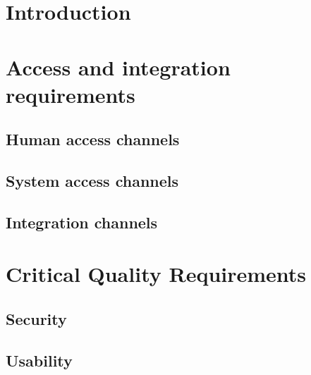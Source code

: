 \documentclass[a4paper,12pt,titlepage]{article}
\begin{document}


\tableofcontents
\newpage
\section{Introduction}

%
		
\section{Access and integration requirements}
	\subsection{Human access channels}
		
	\subsection{System access channels}
	
	\subsection{Integration channels}
	
\newpage
\section{Critical Quality Requirements}
\subsection{Security}
	
	
\subsection{Usability}
	
	
\end{document}
